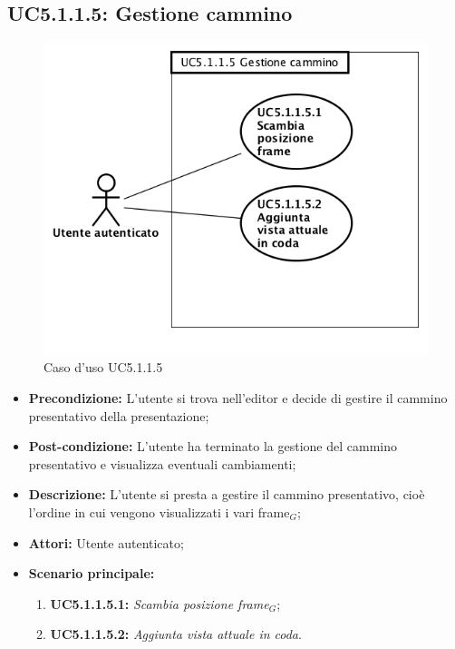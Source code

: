 \newpage
\subsection{ UC5.1.1.5: Gestione cammino}

\begin{figure}[h]
	\begin{center}
	\includegraphics[scale=0.4]{diagram/UC5-1-1-5.png}
	\caption{Caso d'uso UC5.1.1.5}
	\end{center}
\end{figure}
\begin{itemize}
	\item \textbf{Precondizione:} L’utente si trova nell'editor e decide di gestire il cammino presentativo della presentazione;
	\item \textbf{Post-condizione:} L’utente ha terminato la gestione del cammino presentativo e visualizza eventuali cambiamenti;
	\item \textbf{Descrizione:} L’utente si presta a gestire il cammino presentativo, cioè l'ordine in cui vengono visualizzati i vari frame$_G$;
	\item \textbf{Attori:} Utente autenticato;
	\item \textbf{Scenario principale:}
	\begin{enumerate}
		\item \textbf{ UC5.1.1.5.1:} \textit{ Scambia posizione frame$_G$};
		\item \textbf{ UC5.1.1.5.2:} \textit{ Aggiunta vista attuale in coda}.
	\end{enumerate}
\end{itemize}
